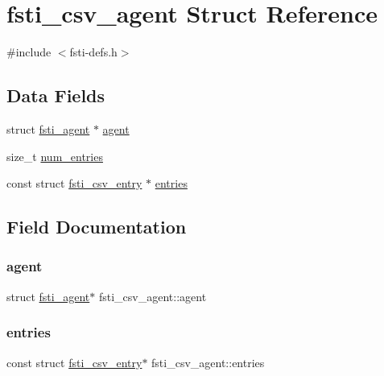 \hypertarget{structfsti__csv__agent}{}\section{fsti\+\_\+csv\+\_\+agent Struct Reference}
\label{structfsti__csv__agent}


{\ttfamily \#include $<$fsti-\/defs.\+h$>$}

\subsection*{Data Fields}
\begin{DoxyCompactItemize}
\item 
struct \mbox{\hyperlink{structfsti__agent}{fsti\+\_\+agent}} $\ast$ \mbox{\hyperlink{structfsti__csv__agent_a4323ae2babc1ce9fe676937a98e25d23}{agent}}
\item 
size\+\_\+t \mbox{\hyperlink{structfsti__csv__agent_aa57cdad849a5aa0fd9a32a4813c0a5a9}{num\+\_\+entries}}
\item 
const struct \mbox{\hyperlink{structfsti__csv__entry}{fsti\+\_\+csv\+\_\+entry}} $\ast$ \mbox{\hyperlink{structfsti__csv__agent_ac58e0cb940257410f80ba13098a96d04}{entries}}
\end{DoxyCompactItemize}


\subsection{Field Documentation}
\mbox{\label{structfsti__csv__agent_a4323ae2babc1ce9fe676937a98e25d23}} 
\subsubsection{\texorpdfstring{agent}{agent}}
{\footnotesize\ttfamily struct \mbox{\hyperlink{structfsti__agent}{fsti\+\_\+agent}}$\ast$ fsti\+\_\+csv\+\_\+agent\+::agent}

\mbox{\label{structfsti__csv__agent_ac58e0cb940257410f80ba13098a96d04}} 
\subsubsection{\texorpdfstring{entries}{entries}}
{\footnotesize\ttfamily const struct \mbox{\hyperlink{structfsti__csv__entry}{fsti\+\_\+csv\+\_\+entry}}$\ast$ fsti\+\_\+csv\+\_\+agent\+::entries}

